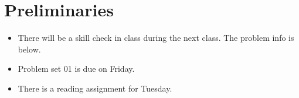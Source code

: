 \documentclass[12pt,letterpaper,noanswers]{exam}
\newcommand{\note}[1]{\textcolor{red}{#1}} %
\renewcommand{\note}[1]{} %
\begin{document}
 \pdfpageheight 11in 
  \pdfpagewidth 8.5in

\noindent 

\note{calendar:
\begin{enumerate}
    \item Tu binary subtraction, least sq intro PS01/2
    \item Th least sq PS02
    \item Tu lin alg PS02/3
    \item Th lin alg PS03
    \item Tu least sq PS03/4
    \item Th ?? PS04
    \item Tu root finding PS04/5
    \item Th root finding PS05 (early)
    \item Tu integration PS06
    \item Th quiz
    \item Tu interpolation PS06
    \item Th interpolation PS06
    \item Tu integration PS07
    \item Th Monte Carlo PS07
    \item Tu differentiation PS08
    \item Th differentiation PS08
    \item Tu diff eq
    \item Th application of diff eq
    \item Tu ODEs
    \item Th ODEs
    \item Tu neural nets
    \item Tu neural nets
    \item Th quiz
    \item Tu presentations
\end{enumerate}}

\note{
\begin{itemize}
    \item what is a floating point system
    \item example
    \item IDing info about a floating point system
    \item 
\end{itemize}
}
\setcounter{section}{-1}
\section{Preliminaries}
\begin{itemize}
\itemsep0pt
\item There will be a skill check in class during the next class.  The problem info is below.
\item Problem set 01 is due on Friday.
\item There is a reading assignment for Tuesday.
\end{itemize}
\end{document}
